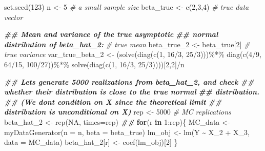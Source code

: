 \documentclass[
  14pt,
]{memoir}
\newenvironment{Shaded}{\begin{snugshade}}{\end{snugshade}}
\newcommand{\AttributeTok}[1]{\textcolor[rgb]{0.77,0.63,0.00}{#1}}
\newcommand{\CommentTok}[1]{\textcolor[rgb]{0.56,0.35,0.01}{\textit{#1}}}
\newcommand{\ConstantTok}[1]{\textcolor[rgb]{0.00,0.00,0.00}{#1}}
\newcommand{\ControlFlowTok}[1]{\textcolor[rgb]{0.13,0.29,0.53}{\textbf{#1}}}
\newcommand{\DecValTok}[1]{\textcolor[rgb]{0.00,0.00,0.81}{#1}}
\newcommand{\DocumentationTok}[1]{\textcolor[rgb]{0.56,0.35,0.01}{\textbf{\textit{#1}}}}
\newcommand{\FunctionTok}[1]{\textcolor[rgb]{0.00,0.00,0.00}{#1}}
\newcommand{\NormalTok}[1]{#1}
\newcommand{\OtherTok}[1]{\textcolor[rgb]{0.56,0.35,0.01}{#1}}
\newcommand{\SpecialCharTok}[1]{\textcolor[rgb]{0.00,0.00,0.00}{#1}}
\begin{document}
\begin{Shaded}
\begin{Highlighting}[]
\FunctionTok{set.seed}\NormalTok{(}\DecValTok{123}\NormalTok{)}
\NormalTok{n           }\OtherTok{\textless{}{-}} \DecValTok{5}       \CommentTok{\# a small sample size}
\NormalTok{beta\_true   }\OtherTok{\textless{}{-}} \FunctionTok{c}\NormalTok{(}\DecValTok{2}\NormalTok{,}\DecValTok{3}\NormalTok{,}\DecValTok{4}\NormalTok{) }\CommentTok{\# true data vector}

\DocumentationTok{\#\# Mean and variance of the true asymptotic }
\DocumentationTok{\#\# normal distribution of beta\_hat\_2:}
\CommentTok{\# true mean}
\NormalTok{beta\_true\_2     }\OtherTok{\textless{}{-}}\NormalTok{ beta\_true[}\DecValTok{2}\NormalTok{] }
\CommentTok{\# true variance}
\NormalTok{var\_true\_beta\_2 }\OtherTok{\textless{}{-}}\NormalTok{ (}\FunctionTok{solve}\NormalTok{(}\FunctionTok{diag}\NormalTok{(}\FunctionTok{c}\NormalTok{(}\DecValTok{1}\NormalTok{, }\DecValTok{16}\SpecialCharTok{/}\DecValTok{3}\NormalTok{, }\DecValTok{25}\SpecialCharTok{/}\DecValTok{3}\NormalTok{)))}\SpecialCharTok{\%*\%} 
                          \FunctionTok{diag}\NormalTok{(}\FunctionTok{c}\NormalTok{(}\DecValTok{4}\SpecialCharTok{/}\DecValTok{9}\NormalTok{, }\DecValTok{64}\SpecialCharTok{/}\DecValTok{15}\NormalTok{, }\DecValTok{100}\SpecialCharTok{/}\DecValTok{27}\NormalTok{))}\SpecialCharTok{\%*\%} 
                    \FunctionTok{solve}\NormalTok{(}\FunctionTok{diag}\NormalTok{(}\FunctionTok{c}\NormalTok{(}\DecValTok{1}\NormalTok{, }\DecValTok{16}\SpecialCharTok{/}\DecValTok{3}\NormalTok{, }\DecValTok{25}\SpecialCharTok{/}\DecValTok{3}\NormalTok{))))[}\DecValTok{2}\NormalTok{,}\DecValTok{2}\NormalTok{]}\SpecialCharTok{/}\NormalTok{n}

\DocumentationTok{\#\# Let\textquotesingle{}s generate 5000 realizations from beta\_hat\_2, and check }
\DocumentationTok{\#\# whether their distribution is close to the true normal }
\DocumentationTok{\#\# distribution.}
\DocumentationTok{\#\# (We don\textquotesingle{}t condition on X since the theoretical limit }
\DocumentationTok{\#\# distribution is unconditional on X)}
\NormalTok{rep        }\OtherTok{\textless{}{-}} \DecValTok{5000} \CommentTok{\# MC replications}
\NormalTok{beta\_hat\_2 }\OtherTok{\textless{}{-}} \FunctionTok{rep}\NormalTok{(}\ConstantTok{NA}\NormalTok{, }\AttributeTok{times=}\NormalTok{rep)}
\DocumentationTok{\#\#}
\ControlFlowTok{for}\NormalTok{(r }\ControlFlowTok{in} \DecValTok{1}\SpecialCharTok{:}\NormalTok{rep)\{}
\NormalTok{    MC\_data }\OtherTok{\textless{}{-}} \FunctionTok{myDataGenerator}\NormalTok{(}\AttributeTok{n    =}\NormalTok{ n, }
                               \AttributeTok{beta =}\NormalTok{ beta\_true)}
\NormalTok{    lm\_obj        }\OtherTok{\textless{}{-}} \FunctionTok{lm}\NormalTok{(Y }\SpecialCharTok{\textasciitilde{}}\NormalTok{ X\_2 }\SpecialCharTok{+}\NormalTok{ X\_3, }\AttributeTok{data =}\NormalTok{ MC\_data)}
\NormalTok{    beta\_hat\_2[r] }\OtherTok{\textless{}{-}} \FunctionTok{coef}\NormalTok{(lm\_obj)[}\DecValTok{2}\NormalTok{]}
\NormalTok{\}}


\end{Highlighting}
\end{Shaded}
\end{document}
